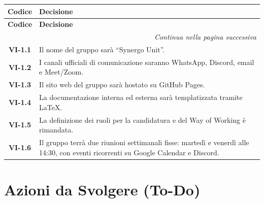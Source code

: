 \renewcommand{\arraystretch}{1.3}

\vspace{-0.3cm}
\noindent
\begin{longtable}{c p{12cm}}
    \toprule
    \textbf{Codice} & \textbf{Decisione} \\
    \midrule
    \endfirsthead

    \toprule
    \textbf{Codice} & \textbf{Decisione} \\
    \midrule
    \endhead

    \midrule
    \multicolumn{2}{r}{\textit{Continua nella pagina successiva}} \\
    \midrule
    \endfoot

    \bottomrule
    \endlastfoot

    \textbf{VI-1.1} & Il nome del gruppo sarà “Synergo Unit”. \\
    \textbf{VI-1.2} & I canali ufficiali di comunicazione saranno WhatsApp, Discord, email e Meet/Zoom. \\
    \textbf{VI-1.3} & Il sito web del gruppo sarà hostato su GitHub Pages. \\
    \textbf{VI-1.4} & La documentazione interna ed esterna sarà templatizzata tramite LaTeX. \\
    \textbf{VI-1.5} & La definizione dei ruoli per la candidatura e del Way of Working è rimandata. \\
    \textbf{VI-1.6} & Il gruppo terrà due riunioni settimanali fisse: martedì e venerdì alle 14:30, con eventi ricorrenti su Google Calendar e Discord. \\
\end{longtable}

\section{Azioni da Svolgere (To-Do)}

\renewcommand{\arraystretch}{1.3}

